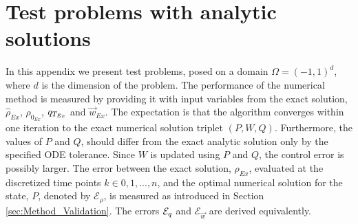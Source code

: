 \section{Test problems with analytic solutions}\label{app:TestProblems}

In this appendix we present test problems, posed on a domain $\Omega=(-1,1)^d$, where $d$ is the dimension of the problem. The performance of the numerical method is measured by providing it with input variables from the exact solution, $\widehat \rho_{Ex}$, $\rho_{0_{Ex}}$, $q_{T_{Ex}}$ and $\vec{w}_{Ex}$. The expectation is that the algorithm converges within one iteration to the exact numerical solution triplet $(P,W,Q)$. Furthermore, the values of $P$ and $Q$, should differ from the exact analytic solution only by the specified ODE tolerance. Since $W$ is updated using $P$ and $Q$, the control error is possibly larger.
The error between the exact solution, $\rho_{Ex}$, evaluated at the discretized time points $k \in 0,1,...,n$, and the optimal numerical solution for the state, $P$, denoted by $\mathcal{E}_\rho$, is measured as introduced in Section \ref{sec:Method_Validation}. The errors $\mathcal{E}_q$ and $\mathcal{E}_{\vec{w}}$ are derived equivalently.
\vspace{0.75em}

